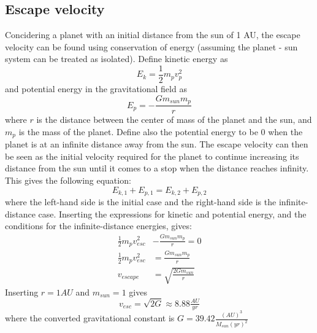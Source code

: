 \subsection{Escape velocity}
Concidering a planet with an initial distance from the sun of 1 AU, the escape velocity can be
found using conservation of energy (assuming the planet - sun system can be treated as isolated).
Define kinetic energy as
$$E_k = \frac{1}{2}m_{p}v_{p}^2$$
and potential energy in the gravitational field as
$$E_p = -\frac{Gm_{sun}m_{p}}{r}$$
where $r$ is the distance between the center of mass of the planet and the sun, and $m_p$ is the
mass of the planet. Define also the potential
energy to be 0 when the planet is at an infinite distance away from the sun. The escape velocity can
then be seen as the initial velocity required for the planet to continue increasing its distance from
the sun until it comes to a stop when the distance reaches infinity. This gives the following
equation:
\begin{equation*}
E_{k,1} + E_{p,1} = E_{k,2} + E_{p,2}
\end{equation*}
where the left-hand side is the initial case and the right-hand side is the infinite-distance
case. Inserting the expressions for kinetic and potential energy, and the conditions for the
infinite-distance energies, gives:
\begin{align*}
\tfrac{1}{2}m_{p}v_{esc}^2 &- \frac{Gm_{sun}m_{p}}{r} = 0 \\
\tfrac{1}{2}m_{p}v_{esc}^2 &= \frac{Gm_{sun}m_{p}}{r} \\
v_{escape} &= \sqrt{\tfrac{2Gm_{sun}}{r}}
\end{align*}
Inserting $r = 1AU$ and $m_{sun} = 1$ gives 
\begin{equation}\label{eq:escape}
v_{esc} = \sqrt{2G} \approx 8.88\tfrac{AU}{yr}
\end{equation}
where the converted gravitational constant is $G = 39.42 \frac{(AU)^3}{M_{sun}(yr)^2}$


